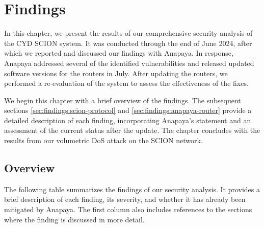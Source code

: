 \chapter{Findings}
\label{ch:findings}


In this chapter, we present the results of our comprehensive security analysis of the CYD SCION system.
It was conducted through the end of June 2024, after which we reported and discussed our findings with Anapaya.
In response, Anapaya addressed several of the identified vulnerabilities and released updated software versions for the routers in July.
After updating the routers, we performed a re-evaluation of the system to assess the effectiveness of the fixes.

We begin this chapter with a brief overview of the findings.
The subsequent sections \cref{sec:findings:scion-protocol} and \cref{sec:findings:anapaya-router} provide a detailed description of each finding, incorporating Anapaya's statement and an assessment of the current status after the update.
The chapter concludes with the results from our volumetric DoS attack on the SCION network.

\section{Overview}
\label{sec:findings:overview}

The following table summarizes the findings of our security analysis.
It provides a brief description of each finding, its severity, and whether it has already been mitigated by Anapaya.
The first column also includes references to the sections where the finding is discussed in more detail.

